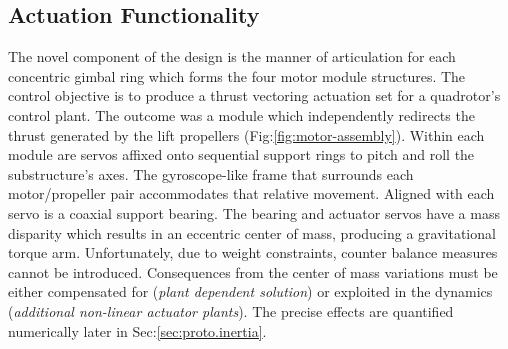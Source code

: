 \subsection{Actuation Functionality}
\label{subsec:proto.design.actuation}
The novel component of the design is the manner of articulation for each concentric gimbal ring which forms the four motor module structures. The control objective is to produce a thrust vectoring actuation set for a quadrotor's control plant. The outcome was a module which independently redirects the thrust generated by the lift propellers (Fig:\ref{fig:motor-assembly}). Within each module are servos affixed onto sequential support rings to pitch and roll the substructure's axes. The gyroscope-like frame that surrounds each motor/propeller pair accommodates that relative movement. Aligned with each servo is a coaxial support bearing. The bearing and actuator servos have a mass disparity which results in an eccentric center of mass, producing a gravitational torque arm. Unfortunately, due to weight constraints, counter balance measures cannot be introduced. Consequences from the center of mass variations must be either compensated for (\emph{plant dependent solution}) or exploited in the dynamics (\emph{additional non-linear actuator plants}). The precise effects are quantified numerically later in Sec:\ref{sec:proto.inertia}.
\par

